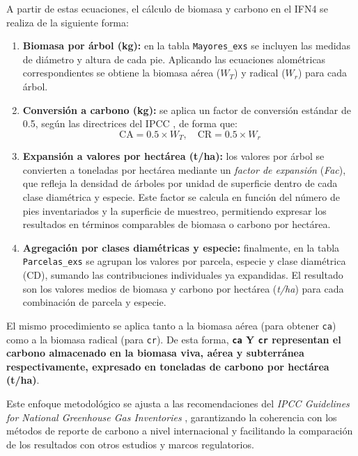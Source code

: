 \noindent
A partir de estas ecuaciones, el cálculo de biomasa y carbono en el IFN4 se realiza de la siguiente forma:

\begin{enumerate}
    \item \textbf{Biomasa por árbol (kg):} en la tabla \texttt{Mayores\_exs} se incluyen las medidas de diámetro y altura de cada pie. Aplicando las ecuaciones alométricas correspondientes se obtiene la biomasa aérea ($W_T$) y radical ($W_r$) para cada árbol.

    \item \textbf{Conversión a carbono (kg):} se aplica un factor de conversión estándar de 0.5, según las directrices del IPCC \cite{IPCC2006}, de forma que:
          \[
              \text{CA} = 0.5 \times W_T, \quad \text{CR} = 0.5 \times W_r
          \]

    \item \textbf{Expansión a valores por hectárea (t/ha):} los valores por árbol se convierten a toneladas por hectárea mediante un \textit{factor de expansión} (\textit{Fac}), que refleja la densidad de árboles por unidad de superficie dentro de cada clase diamétrica y especie. Este factor se calcula en función del número de pies inventariados y la superficie de muestreo, permitiendo expresar los resultados en términos comparables de biomasa o carbono por hectárea.

    \item \textbf{Agregación por clases diamétricas y especie:} finalmente, en la tabla \texttt{Parcelas\_exs} se agrupan los valores por parcela, especie y clase diamétrica (CD), sumando las contribuciones individuales ya expandidas. El resultado son los valores medios de biomasa y carbono por hectárea (\textit{t/ha}) para cada combinación de parcela y especie.
\end{enumerate}


El mismo procedimiento se aplica tanto a la biomasa aérea (para obtener \texttt{ca}) como a la biomasa radical (para \texttt{cr}). De esta forma, \textbf{\texttt{ca} Y \texttt{cr} representan el carbono almacenado en la biomasa viva, aérea y subterránea respectivamente, expresado en toneladas de carbono por hectárea (t/ha)}.


Este enfoque metodológico se ajusta a las recomendaciones del \textit{IPCC Guidelines for National Greenhouse Gas Inventories} \cite{IPCC2006}, garantizando la coherencia con los métodos de reporte de carbono a nivel internacional y facilitando la comparación de los resultados con otros estudios y marcos regulatorios.


